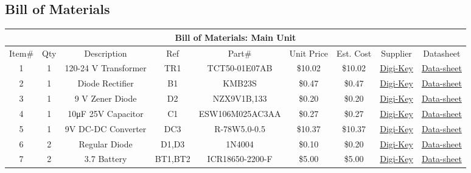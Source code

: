 \begin{landscape}
\section{Bill of Materials}
\begin{center}
  \begin{table}[h]
    \addtocounter{table}{-1}
  \begin{longtable}[c]{|c|c|c|c|c|c|c|c|c|}
    \hline
    \multicolumn{9}{|c|}{Bill of Materials: Main Unit}\\
    \hline
    Item\#&Qty&Description&Ref&Part\#&Unit Price&Est. Cost&Supplier&Datasheet\\
    \hline
    1&1&120-24 \si{\V} Transformer&TR1&TCT50-01E07AB&\$10.02&\$10.02&\href{https://www.digikey.com/en/products/detail/triad-magnetics/TCT50-01E07AB/2688350}{Digi-Key}&\href{http://catalog.triadmagnetics.com/Asset/TCT50-01E07AB.pdf}{Data-sheet}\\
    \hline
    2&1&Diode Rectifier&B1&KMB23S&\$0.47&\$0.47&\href{https://www.digikey.com/en/products/detail/smc-diode-solutions/KMB23S/7898339}{Digi-Key}&\href{https://www.smc-diodes.com/propdf/KMB22S\%20THRU\%20KMB220S\%20N1952\%20REV.B.pdf}{Data-sheet}\\
    \hline
    3&1&9 \si{\V} Zener Diode&D2&NZX9V1B,133&\$0.20&\$0.20&\href{https://www.digikey.com/en/products/detail/nexperia-usa-inc/NZX9V1B-133/2119779}{Digi-Key}&\href{https://assets.nexperia.com/documents/data-sheet/NZX_SER.pdf}{Data-sheet}\\
    \hline
    4&1&10\si{\micro\farad} 25\si{\V} Capacitor&C1&ESW106M025AC3AA&\$0.27&\$0.27&\href{https://www.digikey.com/en/products/detail/kemet/ESW106M025AC3AA/13176208?s=N4IgTCBcDaIBwHYCCBhOBGArJkBdAvkA}{Digi-Key}&\href{https://api.kemet.com/component-edge/download/datasheet/ESW106M025AC3AA.pdf}{Data-sheet}\\
    \hline
    5&1&9\si{\V} DC-DC Converter&DC3&R-78W5.0-0.5&\$10.37&\$10.37&\href{https://www.digikey.com/en/products/detail/recom-power/R-78W9-0-0-5/4930587?s=N4IgTCBcDaIEoFoDsAOA6gTgHQAYE6wFYQBdAXyA}{Digi-Key}&\href{https://recom-power.com/pdf/Innoline/R-78W-0.5.pdf}{Data-sheet}\\
    \hline
    6&2&Regular Diode&D1,D3&1N4004&\$0.10&\$0.20&\href{https://www.digikey.com/en/products/detail/nte-electronics-inc/1N4004/11645015}{Digi-Key}&\href{https://www.digikey.com/en/products/detail/nte-electronics-inc/1N4004/11645015}{Data-sheet}\\
    \hline
    7&2&3.7 Battery&BT1,BT2&ICR18650-2200-F&\$5.00&\$5.00&\href{https://www.digikey.com/en/products/detail/pkcell/ICR18650-2200-F/11629982?s=N4IgTCBcDaIJIGEBKBGAHANgKwAYC0YYO\%2BAYiALoC\%2BQA}{Digi-Key}&\href{https://media.digikey.com/pdf/Data\%20Sheets/FusPower\%20PDF's/ICR18650_2200.pdf}{Data-sheet}\\

\end{longtable}
\end{table}
\end{center}
\end{landscape}
